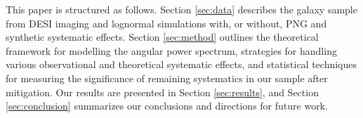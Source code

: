 This paper is structured as follows. Section \ref{sec:data} describes the galaxy sample from DESI imaging and lognormal simulations with, or without, PNG and synthetic systematic effects. Section \ref{sec:method} outlines the theoretical framework for modelling the angular power spectrum, strategies for handling various observational and theoretical systematic effects, and statistical techniques for measuring the significance of remaining systematics in our sample after mitigation. Our results are presented in Section \ref{sec:results}, and Section \ref{sec:conclusion} summarizes our conclusions and directions for future work.